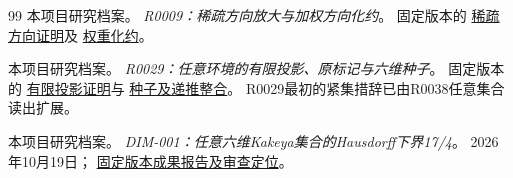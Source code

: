 \begin{thebibliography}{99}
本项目研究档案。
\emph{R0009：稀疏方向放大与加权方向化约}。
固定版本的
\href{https://github.com/lixiang90/kakeya_research/blob/774c3614ec3e810c127c875a9f5abb60748be848/notes/40_multiscale/plank_inputs/R0009_sparse_direction_amplification.md}{稀疏方向证明}及
\href{https://github.com/lixiang90/kakeya_research/blob/774c3614ec3e810c127c875a9f5abb60748be848/notes/40_multiscale/plank_inputs/R0009_weighted_direction_reduction.md}{权重化约}。

本项目研究档案。
\emph{R0029：任意环境的有限投影、原标记与六维种子}。
固定版本的
\href{https://github.com/lixiang90/kakeya_research/blob/774c3614ec3e810c127c875a9f5abb60748be848/notes/20_dimension_lifting/finite_seed_transfer/R0029_projection_and_prior_audit.md}{有限投影证明}与
\href{https://github.com/lixiang90/kakeya_research/blob/774c3614ec3e810c127c875a9f5abb60748be848/notes/20_dimension_lifting/finite_seed_transfer/R0029_conditional_seed_and_six_dimensional_bound.md}{种子及递推整合}。
R0029最初的紧集措辞已由R0038任意集合读出扩展。

本项目研究档案。
\emph{DIM-001：任意六维Kakeya集合的Hausdorff下界17/4}。
2026年10月19日；
\href{https://github.com/lixiang90/kakeya_research/blob/774c3614ec3e810c127c875a9f5abb60748be848/results/reviewed/DIM-001_six_dimensional_Hausdorff_research_report.md}{固定版本成果报告及审查定位}。
\end{thebibliography}
